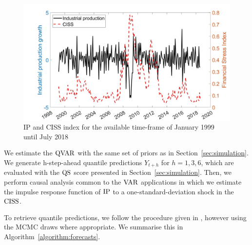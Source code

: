 \begin{figure}
    \centering
    \includegraphics[width=0.9\linewidth]{Figures/FigureData.jpg}
    \caption{IP and CISS index for the available time-frame of January 1999 until July 2018}
    \label{fig:EmpAppData}
\end{figure}
%
We estimate the $\operatorname{QVAR}$ with the same set of priors as in Section~\ref{sec:simulation}. We generate h-step-ahead quantile predictions $Y_{t+h}$ for $h = 1,3,6$, which are evaluated with the $\operatorname{QS}$ score presented in Section~\ref{sec:simulation}. Then, we perform causal analysis common to the $\operatorname{VAR}$ applications in which we estimate the impulse response function of $\operatorname{IP}$ to a one-standard-deviation shock in the $\operatorname{CISS}$. %
%

To retrieve quantile predictions, we follow the procedure given in \citet{chavleishvili2024forecasting}, however using the MCMC draws where appropriate. We summarise this in Algorithm~\ref{algorithm:forecasts}.

